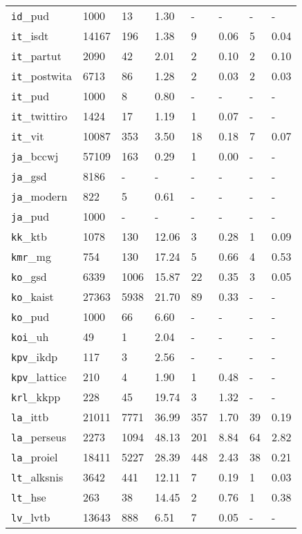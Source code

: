 \begin{longtable}{|l|l|l|l|l|l|l|l|}
\texttt{id}\_pud & 1000 & 13 & 1.30 & - & - & - & -\\
\texttt{it}\_isdt & 14167 & 196 & 1.38 & 9 & 0.06 & 5 & 0.04\\
\texttt{it}\_partut & 2090 & 42 & 2.01 & 2 & 0.10 & 2 & 0.10\\
\texttt{it}\_postwita & 6713 & 86 & 1.28 & 2 & 0.03 & 2 & 0.03\\
\texttt{it}\_pud & 1000 & 8 & 0.80 & - & - & - & -\\
\texttt{it}\_twittiro & 1424 & 17 & 1.19 & 1 & 0.07 & - & -\\
\texttt{it}\_vit & 10087 & 353 & 3.50 & 18 & 0.18 & 7 & 0.07\\
\texttt{ja}\_bccwj & 57109 & 163 & 0.29 & 1 & 0.00 & - & -\\
\texttt{ja}\_gsd & 8186 & - & - & - & - & - & -\\
\texttt{ja}\_modern & 822 & 5 & 0.61 & - & - & - & -\\
\texttt{ja}\_pud & 1000 & - & - & - & - & - & -\\
\texttt{kk}\_ktb & 1078 & 130 & 12.06 & 3 & 0.28 & 1 & 0.09\\
\texttt{kmr}\_mg & 754 & 130 & 17.24 & 5 & 0.66 & 4 & 0.53\\
\texttt{ko}\_gsd & 6339 & 1006 & 15.87 & 22 & 0.35 & 3 & 0.05\\
\texttt{ko}\_kaist & 27363 & 5938 & 21.70 & 89 & 0.33 & - & -\\
\texttt{ko}\_pud & 1000 & 66 & 6.60 & - & - & - & -\\
\texttt{koi}\_uh & 49 & 1 & 2.04 & - & - & - & -\\
\texttt{kpv}\_ikdp & 117 & 3 & 2.56 & - & - & - & -\\
\texttt{kpv}\_lattice & 210 & 4 & 1.90 & 1 & 0.48 & - & -\\
\texttt{krl}\_kkpp & 228 & 45 & 19.74 & 3 & 1.32 & - & -\\
\texttt{la}\_ittb & 21011 & 7771 & 36.99 & 357 & 1.70 & 39 & 0.19\\
\texttt{la}\_perseus & 2273 & 1094 & 48.13 & 201 & 8.84 & 64 & 2.82\\
\texttt{la}\_proiel & 18411 & 5227 & 28.39 & 448 & 2.43 & 38 & 0.21\\
\texttt{lt}\_alksnis & 3642 & 441 & 12.11 & 7 & 0.19 & 1 & 0.03\\
\texttt{lt}\_hse & 263 & 38 & 14.45 & 2 & 0.76 & 1 & 0.38\\
\texttt{lv}\_lvtb & 13643 & 888 & 6.51 & 7 & 0.05 & - & -\\

\end{longtable}
